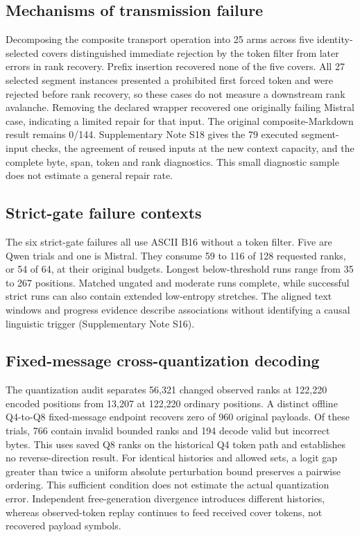 

\subsection*{Mechanisms of transmission failure}\label{sec:v4-transport-results}
Decomposing the composite transport operation into 25 arms across five identity-selected covers distinguished immediate rejection by the token filter from later errors in rank recovery. Prefix insertion recovered none of the five covers. All 27 selected segment instances presented a prohibited first forced token and were rejected before rank recovery, so these cases do not measure a downstream rank avalanche. Removing the declared wrapper recovered one originally failing Mistral case, indicating a limited repair for that input. The original composite-Markdown result remains 0/144. Supplementary Note S18 gives the 79 executed segment-input checks, the agreement of reused inputs at the new context capacity, and the complete byte, span, token and rank diagnostics. This small diagnostic sample does not estimate a general repair rate.

\subsection*{Strict-gate failure contexts}\label{sec:v4-entropy-results}
The six strict-gate failures all use ASCII B16 without a token filter. Five are Qwen trials and one is Mistral. They consume 59 to 116 of 128 requested ranks, or 54 of 64, at their original budgets. Longest below-threshold runs range from 35 to 267 positions. Matched ungated and moderate runs complete, while successful strict runs can also contain extended low-entropy stretches. The aligned text windows and progress evidence describe associations without identifying a causal linguistic trigger (Supplementary Note S16).

\subsection*{Fixed-message cross-quantization decoding}\label{sec:v4-quant-results}
The quantization audit separates 56,321 changed observed ranks at 122,220 encoded positions from 13,207 at 122,220 ordinary positions. A distinct offline Q4-to-Q8 fixed-message endpoint recovers zero of 960 original payloads. Of these trials, 766 contain invalid bounded ranks and 194 decode valid but incorrect bytes. This uses saved Q8 ranks on the historical Q4 token path and establishes no reverse-direction result. For identical histories and allowed sets, a logit gap greater than twice a uniform absolute perturbation bound preserves a pairwise ordering. This sufficient condition does not estimate the actual quantization error. Independent free-generation divergence introduces different histories, whereas observed-token replay continues to feed received cover tokens, not recovered payload symbols.
